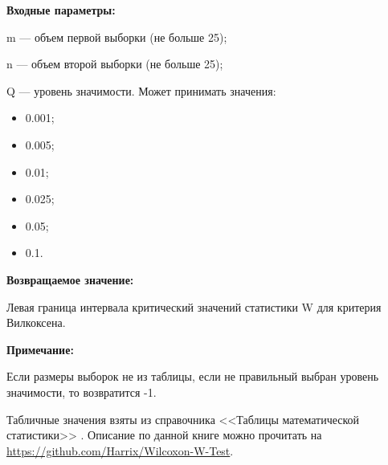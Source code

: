 \textbf{Входные параметры:}

    m --- объем первой выборки (не больше 25);
 
    n --- объем второй выборки (не больше 25);
 
    Q --- уровень значимости. Может принимать значения:
	
\begin{itemize}
\item 0.001;
\item 0.005; 
\item 0.01; 
\item 0.025; 
\item 0.05; 
\item 0.1.
\end{itemize}

\textbf{Возвращаемое значение:}

Левая граница интервала критический значений статистики W для критерия Вилкоксена.

\textbf{Примечание:}

     Если размеры выборок не из таблицы, если не правильный выбран уровень значимости, то возвратится -1.
	 
	 Табличные значения взяты из  справочника <<Таблицы математической статистики>> \cite[с. 357]{book:Bolshev1983}. Описание по данной книге можно прочитать на \href {https://github.com/Harrix/Wilcoxon-W-Test} {https://github.com/Harrix/Wilcoxon-W-Test}.
